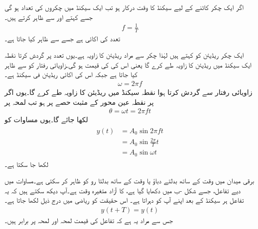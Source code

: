 اگر ایک چکر کاٹنے کے لیے  سیکنڈ کا وقت درکار ہو تب ایک سیکنڈ میں چکروں کی تعداد   ہو گی جسے  کہتے اور  سے ظاہر کرتے ہیں۔
\begin{align}
f=\frac{1}{T}
\end{align}
تعدد کی اکائی  ہے جسے  سے ظاہر کیا جاتا ہے۔

ایک چکر  ریڈیئن کو کہتے ہیں لہٰذا  چکر سے مراد  ریڈیئن کا زاویہ ہے۔یوں  تعدد پر گردش کرتا نقطہ ایک سیکنڈ میں  ریڈیئن کا زاویہ طے کرے گا یعنی اس کی  کی قیمت  ہو گی۔زاویائی رفتار کو  سے ظاہر کیا جاتا ہے جبکہ اس کی اکائی ریڈیئن فی سیکنڈ  ہے۔
\begin{align}
\omega=2\pi f
\end{align}
زاویائی رفتار  سے گردش کرتا ہوا نقطہ  سیکنڈ میں  ریڈیئن کا زاویہ طے کرے گا۔یوں اگر  پر نقطہ عین محور   کے مثبت حصے پر ہو تب لمحہ  پر
\begin{align}
\theta=\omega t=2\pi f t
\end{align}
لکھا جائے گا۔یوں مساوات   کو
\begin{gather}
\begin{aligned}\label{مساوات_بدلتا_سائن_نما_تفاعل_ب}
y(t)&=A_0 \sin 2\pi f t\\
&=A_0\sin \frac{2\pi}{T}t\\
&=A_0 \sin \omega t
\end{aligned}
\end{gather}
لکھا جا سکتا ہے۔

برقی میدان میں  وقت کے ساتھ بدلتے دباؤ یا وقت کے ساتھ بدلتا رو کو ظاہر کر سکتی ہے۔مساوات  میں دیے تفاعل، جسے شکل -ب میں دکھایا گیا ہے،  کا آزاد متغیرہ وقت  ہے۔آپ دیکھ سکتے ہیں کہ یہ تفاعل ہر  سیکنڈ کے بعد اپنے آپ کو دہراتا ہے۔ اس حقیقت کو ریاضی میں درج ذیل لکھا جاتا ہے۔
\begin{align}
y(t+T)=y( t)
\end{align}
جس سے مراد یہ ہے کہ تفاعل کی قیمت لمحہ  اور لمحہ  پر برابر ہیں۔


